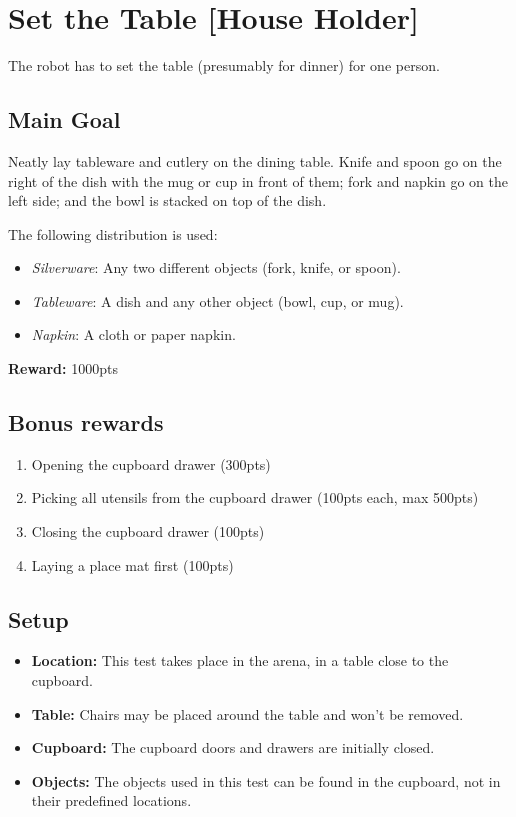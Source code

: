 \section{Set the Table [House Holder]}
The robot has to set the table (presumably for dinner) for one person.


\subsection{Main Goal}
Neatly lay tableware and cutlery on the dining table. Knife and spoon go on the right of the dish with the mug or cup in front of them; fork and napkin go on the left side; and the bowl is stacked on top of the dish.

The following distribution is used:
\begin{itemize}[nosep]
	\item\textit{Silverware}: Any two different objects (fork, knife, or spoon).
	\item\textit{Tableware}: A dish and any other object (bowl, cup, or mug).
	\item\textit{Napkin}: A cloth or paper napkin.
\end{itemize}

\noindent\textbf{Reward:} 1000pts



\subsection{Bonus rewards}
\begin{enumerate}[nosep]
	\item Opening the cupboard drawer (300pts)
	\item Picking all utensils from the cupboard drawer (100pts each, max 500pts)
	\item Closing the cupboard drawer (100pts)
	\item Laying a place mat first (100pts)
\end{enumerate}

\subsection{Setup}
\begin{itemize}[nosep]
	\item \textbf{Location:} This test takes place in the arena, in a table close to the cupboard.
	\item \textbf{Table:} Chairs may be placed around the table and won't be removed.
	\item \textbf{Cupboard:} The cupboard doors and drawers are initially closed.
	\item \textbf{Objects:} The objects used in this test can be found in the cupboard, not in their predefined locations.
\end{itemize}


